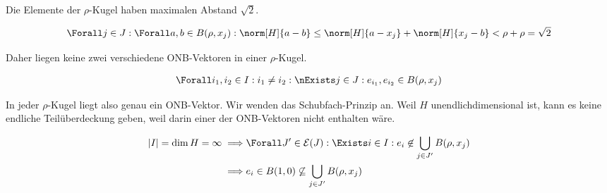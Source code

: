 \begin{solution}
Die Elemente der $\rho$-Kugel haben maximalen Abstand $\sqrt 2$.

\begin{align*}
    \Forall j \in J:
    \Forall a, b \in B(\rho, x_j):
    \norm[H]{a - b}
    \leq
    \norm[H]{a - x_j} + \norm[H]{x_j - b}
    <
    \rho + \rho
    =
    \sqrt 2
\end{align*}

Daher liegen keine zwei verschiedene ONB-Vektoren in einer $\rho$-Kugel.

\begin{align*}
    \Forall i_1, i_2 \in I:
    i_1 \neq i_2:
    \nExists j \in J:
    e_{i_1}, e_{i_2} \in B(\rho, x_j)
\end{align*}

In jeder $\rho$-Kugel liegt also genau ein ONB-Vektor.
Wir wenden das Schubfach-Prinzip an.
Weil $H$ unendlichdimensional ist, kann es keine endliche Teilüberdeckung geben, weil darin einer der ONB-Vektoren nicht enthalten wäre.

\begin{align*}
    |I| = \dim H = \infty
    \implies
    & \Forall J^\prime \in \mathcal{E}(J):
    \Exists i \in I:
    e_i \not \in \bigcup_{j \in J^\prime} B(\rho, x_j) \\
    \implies
    & e_i \in B(1, 0) \not \subseteq \bigcup_{j \in J^\prime} B(\rho, x_j)
\end{align*}

\end{solution}

